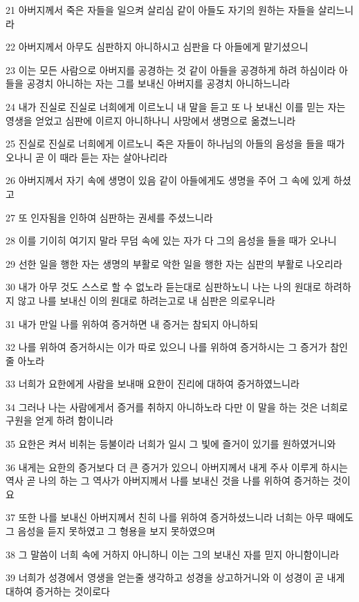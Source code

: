 \par 21 아버지께서 죽은 자들을 일으켜 살리심 같이 아들도 자기의 원하는 자들을 살리느니라
\par 22 아버지께서 아무도 심판하지 아니하시고 심판을 다 아들에게 맡기셨으니
\par 23 이는 모든 사람으로 아버지를 공경하는 것 같이 아들을 공경하게 하려 하심이라 아들을 공경치 아니하는 자는 그를 보내신 아버지를 공경치 아니하느니라
\par 24 내가 진실로 진실로 너희에게 이르노니 내 말을 듣고 또 나 보내신 이를 믿는 자는 영생을 얻었고 심판에 이르지 아니하나니 사망에서 생명으로 옮겼느니라
\par 25 진실로 진실로 너희에게 이르노니 죽은 자들이 하나님의 아들의 음성을 들을 때가 오나니 곧 이 때라 듣는 자는 살아나리라
\par 26 아버지께서 자기 속에 생명이 있음 같이 아들에게도 생명을 주어 그 속에 있게 하셨고
\par 27 또 인자됨을 인하여 심판하는 권세를 주셨느니라
\par 28 이를 기이히 여기지 말라 무덤 속에 있는 자가 다 그의 음성을 들을 때가 오나니
\par 29 선한 일을 행한 자는 생명의 부활로 악한 일을 행한 자는 심판의 부활로 나오리라
\par 30 내가 아무 것도 스스로 할 수 없노라 듣는대로 심판하노니 나는 나의 원대로 하려하지 않고 나를 보내신 이의 원대로 하려는고로 내 심판은 의로우니라
\par 31 내가 만일 나를 위하여 증거하면 내 증거는 참되지 아니하되
\par 32 나를 위하여 증거하시는 이가 따로 있으니 나를 위하여 증거하시는 그 증거가 참인줄 아노라
\par 33 너희가 요한에게 사람을 보내매 요한이 진리에 대하여 증거하였느니라
\par 34 그러나 나는 사람에게서 증거를 취하지 아니하노라 다만 이 말을 하는 것은 너희로 구원을 얻게 하려 함이니라
\par 35 요한은 켜서 비취는 등불이라 너희가 일시 그 빛에 즐거이 있기를 원하였거니와
\par 36 내게는 요한의 증거보다 더 큰 증거가 있으니 아버지께서 내게 주사 이루게 하시는 역사 곧 나의 하는 그 역사가 아버지께서 나를 보내신 것을 나를 위하여 증거하는 것이요
\par 37 또한 나를 보내신 아버지께서 친히 나를 위하여 증거하셨느니라 너희는 아무 때에도 그 음성을 듣지 못하였고 그 형용을 보지 못하였으며
\par 38 그 말씀이 너희 속에 거하지 아니하니 이는 그의 보내신 자를 믿지 아니함이니라
\par 39 너희가 성경에서 영생을 얻는줄 생각하고 성경을 상고하거니와 이 성경이 곧 내게 대하여 증거하는 것이로다
